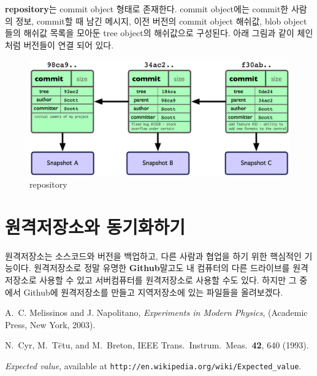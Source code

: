 \documentclass[letterpaper,12pt]{article}
\begin{document}
\textbf{repository}는 commit object 형태로 존재한다. commit object에는 commit한 사람의 정보, commit할 때 남긴 메시지, 이전 버전의 commit object 해쉬값, blob object들의 해쉬값 목록을 모아둔 tree object의 해쉬값으로 구성된다. 아래 그림과 같이 체인처럼 버전들이 연결 되어 있다.
\begin{figure}[ht] 
        \centering \includegraphics[width=0.8\columnwidth]{repository}
         \caption{
                \label{fig:repository}  
                repository
        }
\end{figure}

\section{원격저장소와 동기화하기}
원격저장소는 소스코드와 버전을 백업하고, 다른 사람과 협업을 하기 위한 핵심적인 기능이다. 원격저장소로 정말 유명한 \textbf{Github}말고도 내 컴퓨터의 다른 드라이브를 원격저장소로 사용할 수 있고 서버컴퓨터를 원격저장소로 사용할 수도 있다. 하지만 그 중에서 Github에 원격저장소를 만들고 지역저장소에 있는 파일들을 올려보겠다.   

















\begin{thebibliography}{99}

A.~C. Melissinos and J. Napolitano, \textit{Experiments in Modern Physics},
(Academic Press, New York, 2003).

N.\ Cyr, M.\ T$\hat{e}$tu, and M.\ Breton,
IEEE Trans.\ Instrum.\ Meas.\ \textbf{42}, 640 (1993).

 \emph{Expected value},  available at
\texttt{http://en.wikipedia.org/wiki/Expected\_value}.

\end{thebibliography}
\end{document}
